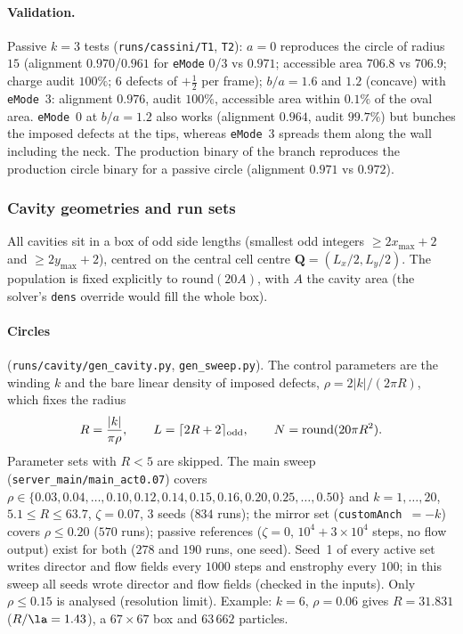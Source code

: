 \paragraph{Validation.} Passive $k=3$ tests (\texttt{runs/cassini/T1}, \texttt{T2}): $a=0$ reproduces the circle of radius $15$
(alignment $0.970$/$0.961$ for \texttt{eMode} 0/3 vs $0.971$; accessible area $706.8$ vs $706.9$; charge audit $100\%$;
$6$ defects of $+\tfrac12$ per frame); $b/a=1.6$ and $1.2$ (concave) with \texttt{eMode}~3: alignment $0.976$, audit $100\%$,
accessible area within $0.1\%$ of the oval area. \texttt{eMode}~0 at $b/a=1.2$ also works (alignment $0.964$, audit $99.7\%$)
but bunches the imposed defects at the tips, whereas \texttt{eMode}~3 spreads them along the wall including the neck.
The production binary of the branch reproduces the production circle binary for a passive circle
(alignment $0.971$ vs $0.972$).

\subsubsection{Cavity geometries and run sets}
\label{sec:md-geom}

All cavities sit in a box of odd side lengths (smallest odd integers $\ge 2x_{\max}+2$ and $\ge2y_{\max}+2$), centred on the
central cell centre $\mathbf Q=(L_x/2,L_y/2)$. The population is fixed explicitly to $\mathrm{round}(20A)$, with $A$ the cavity area
(the solver's \texttt{dens} override would fill the whole box).

\paragraph{Circles} (\texttt{runs/cavity/gen\_cavity.py}, \texttt{gen\_sweep.py}). The control parameters are the winding $k$ and the
bare linear density of imposed defects, $\rho=2|k|/(2\pi R)$, which fixes the radius
\begin{equation}
  R=\frac{|k|}{\pi\rho},\qquad L=\lceil 2R+2\rceil_{\rm odd},\qquad N=\mathrm{round}(20\pi R^2).
\end{equation}
Parameter sets with $R<5$ are skipped. The main sweep (\texttt{server\_main/main\_act0.07}) covers
$\rho\in\{0.03,0.04,\dots,0.10,0.12,0.14,0.15,0.16,0.20,0.25,\dots,0.50\}$ and $k=1,\dots,20$, $5.1\le R\le63.7$, $\zeta=0.07$,
$3$ seeds ($834$ runs); the mirror set (\texttt{customAnch}~$=-k$) covers $\rho\le0.20$ ($570$ runs); passive references
($\zeta=0$, $10^4+3\times10^4$ steps, no flow output) exist for both ($278$ and $190$ runs, one seed). Seed~1 of every active set
writes director and flow fields every $1000$ steps and enstrophy every $100$; in this sweep all seeds wrote director and flow fields
(checked in the inputs). Only $\rho\le0.15$ is analysed (resolution limit). Example: $k=6$, $\rho=0.06$ gives $R=31.831$
($R/\la=1.43$), a $67\times67$ box and $63\,662$ particles.

